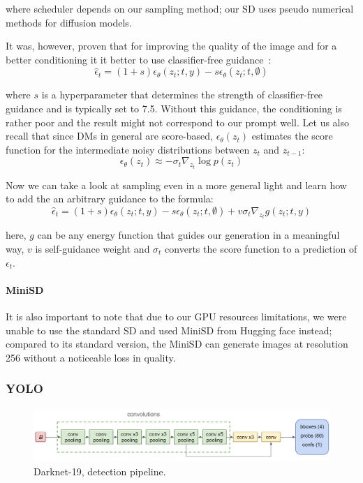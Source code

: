 where scheduler depends on our sampling method; our SD uses pseudo numerical methods for diffusion models.


It was, however, proven that for improving the quality of the image and for a better conditioning it it better to use classifier-free guidance~\cite{ho2022classifierfree}:
$$\hat\epsilon_t = (1+s)\epsilon_\theta(z_t;t,y) - s\epsilon_\theta(z_t;t,\emptyset)$$

where $s$ is a hyperparameter that determines the strength of classifier-free guidance and is typically set to 7.5.
Without this guidance, the conditioning is rather poor and the result might not correspond to our prompt well.
Let us also recall that since DMs in general are score-based, $\epsilon_\theta(z_t)$ estimates the score function for the intermediate noisy distributions between $z_t$ and $z_{t-1}$:
$$\epsilon_\theta(z_t) \approx -\sigma_t\nabla_{z_t} \log p(z_t)$$

Now we can take a look at sampling even in a more general light and learn how to add the an arbitrary guidance to the formula:
$$\hat\epsilon_t = (1+s)\epsilon_\theta(z_t;t,y) - s\epsilon_\theta(z_t;t,\emptyset) + v\sigma_t\nabla_{z_t}g(z_t; t, y)$$

here, $g$ can be any energy function that guides our generation in a meaningful way, $v$ is self-guidance weight and $\sigma_t$ converts the score function to a prediction of $\epsilon_t$.

\paragraph{MiniSD} It is also important to note that due to our GPU resources limitations, we were unable to use the standard SD and used MiniSD from Hugging face instead; compared to its standard version, the MiniSD can generate images at resolution 256 without a noticeable loss in quality.

\subsubsection{YOLO}

\begin{figure}[ht!]
\centering
\includegraphics[width=150mm]{figures/yolov2.png}
\caption{Darknet-19, detection pipeline.}
\label{darknet19_detection}
\end{figure}

